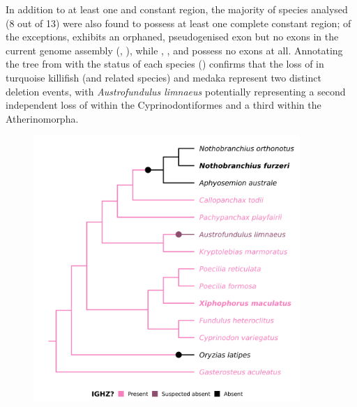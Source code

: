 In addition to at least one  and  constant region, the majority of species analysed (8 out of 13) were also found to possess at least one complete  constant region; of the exceptions,  exhibits an orphaned, pseudogenised  exon but no \cz{} exons in the current genome assembly (, ), while , , \Nfu and  possess no  exons at all. Annotating the tree from  with the  status of each species () confirms that the loss of  in turquoise killifish (and related species) and medaka represent two distinct deletion events, with \textit{Austrofundulus limnaeus} potentially representing a second independent loss of  within the Cyprinodontiformes and a third within the Atherinomorpha.

\begin{figure}
\centering
\includegraphics[width=0.9\textwidth]{_Figures/png/species-tree-large-ighz}
\label{fig:species-tree-large-ighz}
\end{figure}

